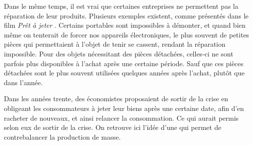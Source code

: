 \bigbreak
Dans le même temps, il est vrai que certaines entreprises ne permettent pas la réparation de leur produits. Plusieurs exemples existent, comme présentés dans le film \textit{Prêt à jeter} \cite{PretAjeter}. Certains portables sont impossibles à démonter, et quand bien même on tenterait de forcer nos appareils électroniques, le plus souvent de petites pièces qui permettaient à l'objet de tenir se cassent, rendant la réparation impossible. Pour des objets nécessitant des pièces détachées, celles-ci ne sont parfois plus disponibles à l'achat après une certaine période. Sauf que ces pièces détachées sont le plus souvent utilisées quelques années après l'achat, plutôt que dans l'année.

Dans les années trente, des économistes proposaient de sortir de la crise en obligeant les consommateurs à jeter leur biens après une certaine date, afin d'en racheter de nouveaux, et ainsi relancer la consommation. Ce qui aurait permis selon eux de sortir de la crise. On retrouve ici l'idée d'une \op qui permet de contrebalancer la production de masse.

